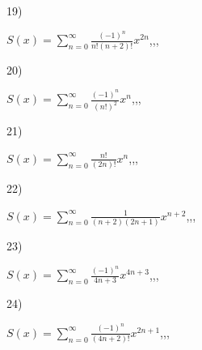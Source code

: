\documentclass[11pt, ukrainian]{article}
\begin{document}
\par
\vspace{0.9cm}
19) \space 
{%
{$S(x)=\sum\limits_{n=0}^{\infty}{\frac{(-1)^n}{n!(n+2)!}}{x^{{2n}}}$},,, \par \smallskip  
}
\par
\vspace{0.9cm}
20) \space 
{%
{$S(x)=\sum\limits_{n=0}^{\infty}{\frac{(-1)^n}{(n!)^2}}{x^{{n}}}$},,, \par \smallskip  
}
\par
\newpage
21) \space 
{%
{$S(x)=\sum\limits_{n=0}^{\infty}{\frac{n!}{(2n)!}}{x^{{n}}}$},,, \par \smallskip  
}
\par
\vspace{0.9cm}
22) \space 
{%
{$S(x)=\sum\limits_{n=0}^{\infty}{\frac{1}{(n+2)(2n+1)}}{x^{{n+2}}}$},,, \par \smallskip  
}
\par
\vspace{0.9cm}
23) \space 
{%
{$S(x)=\sum\limits_{n=0}^{\infty}{\frac{(-1)^n}{4n+3}}{x^{{4n+3}}}$},,, \par \smallskip  
}
\par
\vspace{0.9cm}
24) \space 
{%
{$S(x)=\sum\limits_{n=0}^{\infty}{\frac{(-1)^n}{(4n+2)!}}{x^{{2n+1}}}$},,, \par \smallskip  
}
\end{document}
